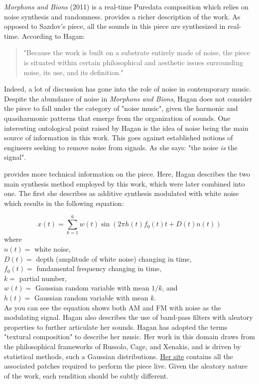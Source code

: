 \textit{Morphons and Bions} (2011) is a real-time Puredata composition which relies on noise synthesis and randomness. \cite{hagan2012aesthetic} provides a richer description of the work. As opposed to Sazdov's piece, all the sounds in this piece are synthesized in real-time. According to Hagan: 

\begin{quote}
    "Because the work is built on a substrate entirely made of noise, the piece is situated within certain philosophical and aesthetic issues surrounding noise, its use, and its definition."
\end{quote}

Indeed, a lot of discussion has gone into the role of noise in contemporary music. Despite the abundance of noise in \textit{Morphons and Bions}, Hagan does not consider the piece to fall under the category of "noise music", given the harmonic and quasiharmonic patterns that emerge from the organization of sounds. One interesting ontological point raised by Hagan is the idea of noise being the main source of information in this work. This goes against established notions of engineers seeking to remove noise from signals. As she says: "the noise \textit{is} the signal". 

\cite{hagan2017textural} provides more technical information on the piece. Here, Hagan describes the two main synthesis method employed by this work, which were later combined into one. The first she describes as additive synthesis modulated with white noise which results in the following equation:

$$
x(t)=\sum_{k=1}^{6} w(t) \sin \left(2 \pi h(t) f_{0}(t) t+D(t) n(t)\right)
$$
where \\
$n(t)=$ white noise, \\
$D(t)=$ depth (amplitude of white noise) changing in time, \\ 
$f_{0}(t)=$ fundamental frequency changing in time, \\
$k=$ partial number, \\
$w(t)=$ Gaussian random variable with mean $1 / k$, and \\
$h(t)=$ Gaussian random variable with mean $k$.\\

As you can see the equation shows both AM and FM with noise as the modulating signal. Hagan also describes the use of band-pass filters with aleatory properties to further articulate her sounds. Hagan has adopted the terms "textural composition" to describe her music. Her work in this domain draws from the philosophical frameworks of Russolo, Cage, and Xenakis, and is driven by statistical methods, such a Gaussian distributions. \href{http://www.kerrylhagan.net/#m&b}{Her site} contains all the associated patches required to perform the piece live. Given the aleatory nature of the work, each rendition should be subtly different.


